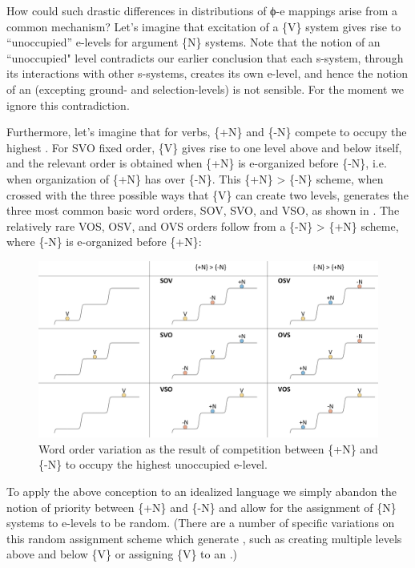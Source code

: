   How could such drastic differences in distributions of ϕ{}-e mappings arise from a common mechanism? Let's imagine that excitation of a \{V\} system gives rise to “unoccupied” e-levels for argument \{N\} systems. Note that the notion of an “unoccupied" level contradicts our earlier conclusion that each s-system, through its interactions with other s-systems, creates its own e-level, and hence the notion of an  (excepting ground- and selection-levels) is not sensible. For the moment we ignore this contradiction.

  Furthermore, let's imagine that for  verbs, \{+N\} and \{-N\} compete to occupy the highest . For SVO fixed order, \{V\} gives rise to one level above and below itself, and the relevant order is obtained when \{+N\} is e-organized before \{-N\}, i.e. when organization of \{+N\} has  over \{-N\}. This \{+N\} > \{-N\} scheme, when crossed with the three possible ways that \{V\} can create two levels, generates the three most common basic word orders, SOV, SVO, and VSO, as shown in {}. The relatively rare VOS, OSV, and OVS orders follow from a \{-N\} > \{+N\} scheme, where \{-N\} is e-organized before \{+N\}:

  
\begin{figure}
\includegraphics[width=\textwidth]{figures/Tilsen-img75.png}
\caption{Word order variation as the result of competition between \{+N\} and \{-N\} to occupy the highest unoccupied e-level.}
\label{fig:4:25}
\end{figure}
 

  To apply the above conception to an idealized  language we simply abandon the notion of priority between \{+N\} and \{-N\} and allow for the assignment of \{N\} systems to e-levels to be random. (There are a number of specific variations on this random assignment scheme which generate , such as creating multiple levels above and below \{V\} or assigning \{V\} to an .)

